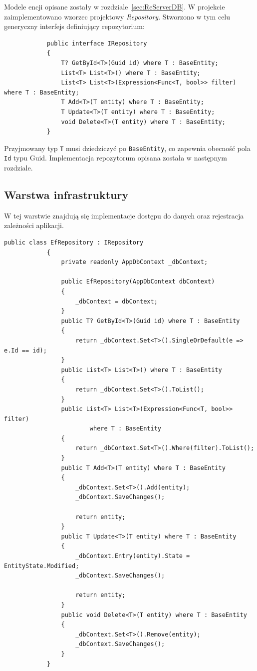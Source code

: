 		Modele encji opisane zostały w rozdziale~\ref{sec:ReServerDB}.
		W projekcie zaimplementowano wzorzec projektowy \emph{Repository}.
		Stworzono w tym celu generyczny interfejs definiujący repozytorium:
		\begin{lstlisting}
			public interface IRepository
			{
				T? GetById<T>(Guid id) where T : BaseEntity;
				List<T> List<T>() where T : BaseEntity;
				List<T> List<T>(Expression<Func<T, bool>> filter) where T : BaseEntity;
				T Add<T>(T entity) where T : BaseEntity;
				T Update<T>(T entity) where T : BaseEntity;
				void Delete<T>(T entity) where T : BaseEntity;
			}
		\end{lstlisting}
		Przyjmowany typ \verb|T| musi dziedziczyć po \verb|BaseEntity|, co zapewnia obecność pola \verb|Id| typu Guid.
		Implementacja repozytorum opisana została w następnym rozdziale.

	\subsection{Warstwa infrastruktury}\label{sec:apiInfr}
		W tej warstwie znajdują się implementacje dostępu do danych oraz rejestracja zależności aplikacji.

		\begin{lstlisting}[label=lst:repository, caption=Implementacja repozytorium, float=h]
			public class EfRepository : IRepository
			{
				private readonly AppDbContext _dbContext;
		
				public EfRepository(AppDbContext dbContext)
				{
					_dbContext = dbContext;
				}
				public T? GetById<T>(Guid id) where T : BaseEntity
				{
					return _dbContext.Set<T>().SingleOrDefault(e => e.Id == id);
				}
				public List<T> List<T>() where T : BaseEntity
				{
					return _dbContext.Set<T>().ToList();
				}
				public List<T> List<T>(Expression<Func<T, bool>> filter)
						where T : BaseEntity
				{
					return _dbContext.Set<T>().Where(filter).ToList();
				}
				public T Add<T>(T entity) where T : BaseEntity
				{
					_dbContext.Set<T>().Add(entity);
					_dbContext.SaveChanges();
		
					return entity;
				}
				public T Update<T>(T entity) where T : BaseEntity
				{
					_dbContext.Entry(entity).State = EntityState.Modified;
					_dbContext.SaveChanges();
		
					return entity;
				}
				public void Delete<T>(T entity) where T : BaseEntity
				{
					_dbContext.Set<T>().Remove(entity);
					_dbContext.SaveChanges();
				}
			}
		\end{lstlisting}

